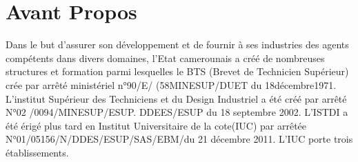 \chapter*{Avant Propos}%
%

\par Dans le but d’assurer son développement et de fournir à ses industries des agents compétents dans divers domaines, l’Etat camerounais a créé de nombreuses structures et formation parmi lesquelles le BTS (Brevet de Technicien Supérieur) crée par arrêté ministériel n°90/E/ (58MINESUP/DUET du 18décembre1971. L’institut Supérieur des Techniciens et du Design Industriel a été créé par arrêté N°02 /0094/MINESUP/ESUP. DDEES/ESUP du 18 septembre 2002. L’ISTDI a été érigé plus tard en Institut Universitaire de la cote(IUC) par arrêtée N°01/05156/N/DDES/ESUP/SAS/EBM/du 21 décembre 2011. L’IUC porte trois établissements.\\
